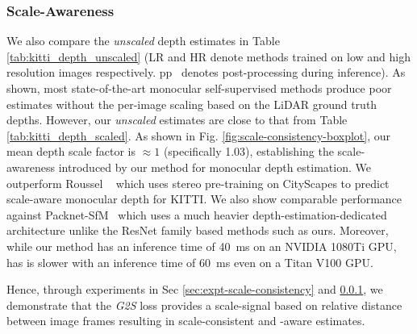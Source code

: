 \subsubsection{Scale-Awareness}
\label{sec:expt-scale-awareness}
We also compare the \textit{unscaled} depth estimates in Table \ref{tab:kitti_depth_unscaled} (LR and HR denote methods trained on low and high resolution  images respectively. pp~\cite{godard2019digging} denotes post-processing during inference). 
As shown, most state-of-the-art monocular self-supervised methods produce poor estimates without the per-image scaling based on the LiDAR ground truth depths. However, our \textit{unscaled} estimates are close to that from Table \ref{tab:kitti_depth_scaled}. As shown in Fig. \ref{fig:scale-consistency-boxplot}, our mean depth scale factor is $\approx 1$  (specifically 1.03), establishing the scale-awareness introduced by our method for monocular depth estimation. 
We outperform Roussel \etal~\cite{roussel2019monocular} which uses stereo pre-training on CityScapes to predict scale-aware monocular depth for KITTI. We also show comparable performance against  Packnet-SfM~\cite{guizilini20203d}
which uses a much heavier depth-estimation-dedicated architecture unlike the ResNet family based methods such as ours. Moreover, while our method has an inference time of \SI{40}{ms} on an NVIDIA 1080Ti GPU, ~\cite{guizilini20203d} has is slower with an inference time of \SI{60}{ms} even on a Titan V100 GPU.   

Hence, through experiments in Sec \ref{sec:expt-scale-consistency} and \ref{sec:expt-scale-awareness}, we demonstrate that the \textit{G2S} loss provides a scale-signal based on relative distance between image frames  resulting in scale-consistent and -aware estimates.







